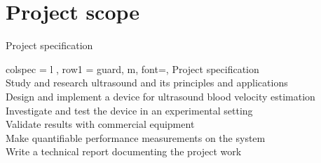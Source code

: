 \section{Project scope}

\begin{table}[htbp]
	\centering
	\caption{Project specification}
	\label{tab:specifications}
	\begin{tblr}[]{%
			colspec = {l
			},
			row{1} = {guard, m, font=\small\bfseries},
		}
		\toprule
		Project specification	\\
		\midrule
		Study and research ultrasound and its principles and applications	\\
		Design and implement a device for ultrasound blood velocity estimation	\\
		Investigate and test the device in an experimental setting		\\
		Validate results with commercial equipment 						\\
		Make quantifiable performance measurements on the system			\\
		Write a technical report documenting the project work			\\ \bottomrule
	\end{tblr}
\end{table}


